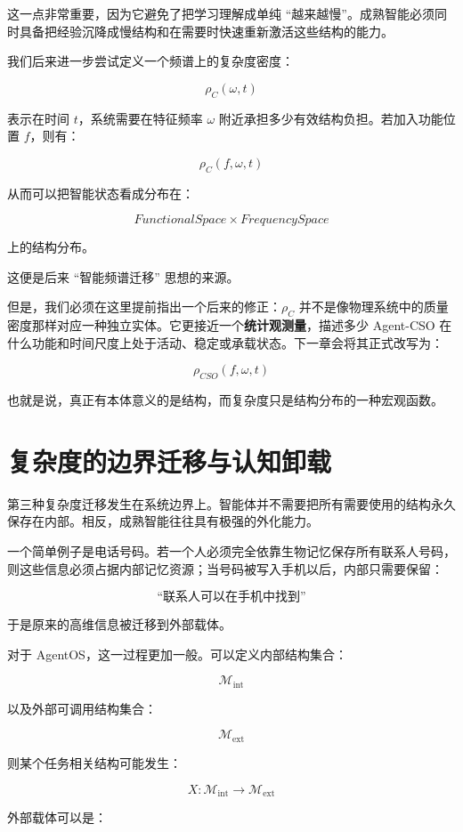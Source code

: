 这一点非常重要，因为它避免了把学习理解成单纯 ``越来越慢''。成熟智能必须同时具备把经验沉降成慢结构和在需要时快速重新激活这些结构的能力。

我们后来进一步尝试定义一个频谱上的复杂度密度：

\[
\rho_C(\omega,t)
\]

表示在时间 $t$，系统需要在特征频率 $\omega$ 附近承担多少有效结构负担。若加入功能位置 $f$，则有：

\[
\rho_C(f,\omega,t)
\]

从而可以把智能状态看成分布在：

\[
FunctionalSpace
\times
FrequencySpace
\]

上的结构分布。

这便是后来 ``智能频谱迁移'' 思想的来源。

但是，我们必须在这里提前指出一个后来的修正：$\rho_C$ 并不是像物理系统中的质量密度那样对应一种独立实体。它更接近一个\textbf{统计观测量}，描述多少 Agent-CSO 在什么功能和时间尺度上处于活动、稳定或承载状态。下一章会将其正式改写为：

\[
\rho_{CSO}(f,\omega,t)
\]

也就是说，真正有本体意义的是结构，而复杂度只是结构分布的一种宏观函数。

\section{复杂度的边界迁移与认知卸载}
\label{sec:boundary-complexity-migration}

第三种复杂度迁移发生在系统边界上。智能体并不需要把所有需要使用的结构永久保存在内部。相反，成熟智能往往具有极强的外化能力。

一个简单例子是电话号码。若一个人必须完全依靠生物记忆保存所有联系人号码，则这些信息必须占据内部记忆资源；当号码被写入手机以后，内部只需要保留：

\[
\text{``联系人可以在手机中找到''}
\]

于是原来的高维信息被迁移到外部载体。

对于 AgentOS，这一过程更加一般。可以定义内部结构集合：

\[
\mathcal{M}_{\mathrm{int}}
\]

以及外部可调用结构集合：

\[
\mathcal{M}_{\mathrm{ext}}
\]

则某个任务相关结构可能发生：

\[
X:
\mathcal{M}_{\mathrm{int}}
\rightarrow
\mathcal{M}_{\mathrm{ext}}
\]

外部载体可以是：

